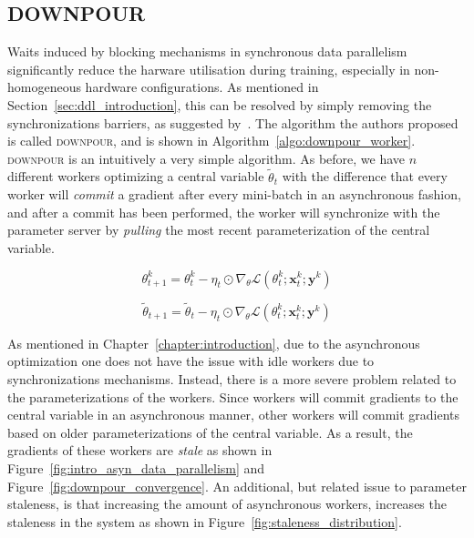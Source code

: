 \subsection{DOWNPOUR}
\label{sec:downpour}

Waits induced by blocking mechanisms in synchronous data parallelism significantly reduce the harware utilisation during training, especially in non-homogeneous hardware configurations. As mentioned in Section~\ref{sec:ddl_introduction}, this can be resolved by simply removing the synchronizations barriers, as suggested by~\cite{dean2012large}. The algorithm the authors proposed is called \textsc{downpour}, and is shown in Algorithm~\ref{algo:downpour_worker}.\\

\textsc{downpour} is an intuitively a very simple algorithm. As before, we have $n$ different workers optimizing a central variable $\tilde{\theta}_t$ with the difference that every worker will \emph{commit} a gradient after every mini-batch in an asynchronous fashion, and after a commit has been performed, the worker will synchronize with the parameter server by \emph{pulling} the most recent parameterization of the central variable.

\begin{equation}
  \label{eq:downpour_worker}
  \theta^k_{t+1} = \theta^k_t - \eta_t \odot \nabla_\theta \mathcal{L}(\theta^k_t;\mathbf{x}^k_t;\mathbf{y}^k)
\end{equation}

\begin{equation}
  \label{eq:downpour_ps}
  \tilde{\theta}_{t+1} = \tilde{\theta}_t - \eta_t \odot \nabla_\theta \mathcal{L}(\theta^k_t;\mathbf{x}^k_t;\mathbf{y}^k)
\end{equation}

As mentioned in Chapter~\ref{chapter:introduction}, due to the asynchronous optimization one does not have the issue with idle workers due to synchronizations mechanisms. Instead, there is a more severe problem related to the parameterizations of the workers. Since workers will commit gradients to the central variable in an asynchronous manner, other workers will commit gradients based on older parameterizations of the central variable. As a result, the gradients of these workers are \emph{stale} as shown in Figure~\ref{fig:intro_asyn_data_parallelism} and Figure~\ref{fig:downpour_convergence}. An additional, but related issue to parameter staleness, is that increasing the amount of asynchronous workers, increases the staleness in the system as shown in Figure~\ref{fig:staleness_distribution}.

